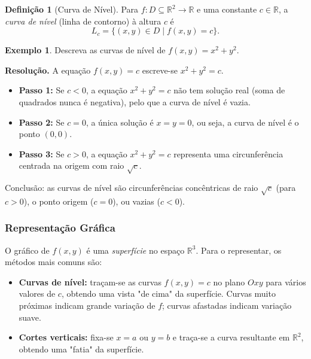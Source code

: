 \documentclass[12pt,a4paper]{article}
\theoremstyle{definition}
\newtheorem{definition}[theorem]{Definição}
\newtheorem{example}[theorem]{Exemplo}
\theoremstyle{remark}
\begin{document}
\begin{definition}[Curva de Nível]
  Para $f:D\subseteq\mathbb{R}^2\to\mathbb{R}$ e uma constante $c\in\mathbb{R}$,
  a \emph{curva de nível} (linha de contorno) à altura $c$ é
  \[
    L_c = \{(x,y)\in D \mid f(x,y) = c\}.
  \]
\end{definition}
 
\begin{example}
  Descreva as curvas de nível de $f(x,y)=x^2+y^2$.
 
  \textbf{Resolução.} A equação $f(x,y)=c$ escreve-se $x^2+y^2=c$.
  \begin{itemize}[nosep]
    \item \textbf{Passo 1:} Se $c<0$, a equação $x^2+y^2=c$ não tem solução
          real (soma de quadrados nunca é negativa), pelo que a curva de nível
          é vazia.
    \item \textbf{Passo 2:} Se $c=0$, a única solução é $x=y=0$, ou seja,
          a curva de nível é o ponto $(0,0)$.
    \item \textbf{Passo 3:} Se $c>0$, a equação $x^2+y^2=c$ representa
          uma circunferência centrada na origem com raio $\sqrt{c}$.
  \end{itemize}
  Conclusão: as curvas de nível são circunferências concêntricas de raio
  $\sqrt{c}$ (para $c>0$), o ponto origem ($c=0$), ou vazias ($c<0$).
\end{example}
 
\subsubsection*{Representação Gráfica}
 
O gráfico de $f(x,y)$ é uma \emph{superfície} no espaço $\mathbb{R}^3$.
Para o representar, os métodos mais comuns são:
 
\begin{itemize}[nosep]
  \item \textbf{Curvas de nível:} traçam-se as curvas $f(x,y)=c$ no plano
        $Oxy$ para vários valores de $c$, obtendo uma vista "de cima" da
        superfície. Curvas muito próximas indicam grande variação de $f$;
        curvas afastadas indicam variação suave.
  \item \textbf{Cortes verticais:} fixa-se $x=a$ ou $y=b$ e traça-se a
        curva resultante em $\mathbb{R}^2$, obtendo uma "fatia" da superfície.
\end{itemize}
 
\end{document}
